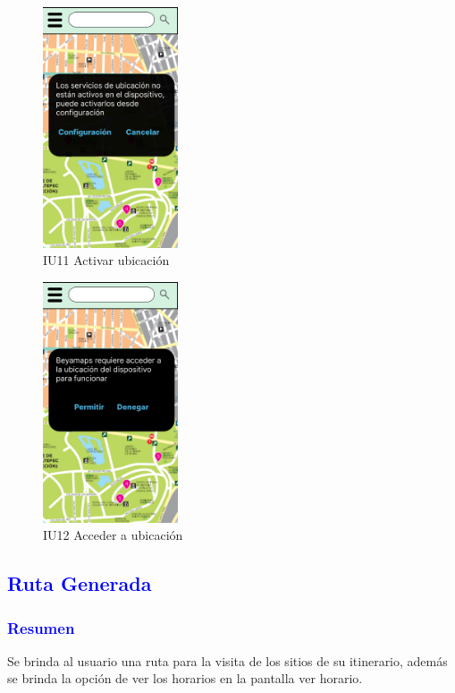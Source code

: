     \begin{figure}[h]
        \centering
        \includegraphics[width= 4cm]{Pantallas Prototipo3/IU11 - Activar ubicacion.jpg}
        \caption{IU11 Activar ubicación}
        \label{fig:enter-label}
    \end{figure}
    
        \begin{figure}[h]
        \centering
        \includegraphics[width= 4cm]{Pantallas Prototipo3/IU12 Pantalla Acceso Ubicacion.jpg}
        \caption{IU12 Acceder a ubicación}
        \label{fig:enter-label}
    \end{figure}



\pagebreak
\subsection{\textcolor{blue}{Ruta Generada}}
\subsubsection{\textcolor{blue}{Resumen}}
Se brinda al usuario una ruta para la visita de los sitios de su itinerario, además se brinda la
opción de ver los horarios en la pantalla ver horario.
